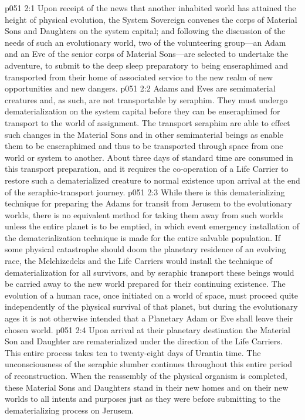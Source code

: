\vs p051 2:1 Upon receipt of the news that another inhabited world has attained the height of physical evolution, the System Sovereign convenes the corps of Material Sons and Daughters on the system capital; and following the discussion of the needs of such an evolutionary world, two of the volunteering group---an Adam and an Eve of the senior corps of Material Sons---are selected to undertake the adventure, to submit to the deep sleep preparatory to being enseraphimed and transported from their home of associated service to the new realm of new opportunities and new dangers.
\vs p051 2:2 Adams and Eves are semimaterial creatures and, as such, are not transportable by seraphim. They must undergo dematerialization on the system capital before they can be enseraphimed for transport to the world of assignment. The transport seraphim are able to effect such changes in the Material Sons and in other semimaterial beings as enable them to be enseraphimed and thus to be transported through space from one world or system to another. About three days of standard time are consumed in this transport preparation, and it requires the co\hyp{}operation of a Life Carrier to restore such a dematerialized creature to normal existence upon arrival at the end of the seraphic\hyp{}transport journey.
\pc \vs p051 2:3 While there is this dematerializing technique for preparing the Adams for transit from Jerusem to the evolutionary worlds, there is no equivalent method for taking them away from such worlds unless the entire planet is to be emptied, in which event emergency installation of the dematerialization technique is made for the entire salvable population. If some physical catastrophe should doom the planetary residence of an evolving race, the Melchizedeks and the Life Carriers would install the technique of dematerialization for all survivors, and by seraphic transport these beings would be carried away to the new world prepared for their continuing existence. The evolution of a human race, once initiated on a world of space, must proceed quite independently of the physical survival of that planet, but during the evolutionary ages it is not otherwise intended that a Planetary Adam or Eve shall leave their chosen world.\plusone
\pc \vs p051 2:4 Upon arrival at their planetary destination the Material Son and Daughter are rematerialized under the direction of the Life Carriers. This entire process takes ten to twenty\hyp{}eight days of Urantia time. The unconsciousness of the seraphic slumber continues throughout this entire period of reconstruction. When the reassembly of the physical organism is completed, these Material Sons and Daughters stand in their new homes and on their new worlds to all intents and purposes just as they were before submitting to the dematerializing process on Jerusem.
